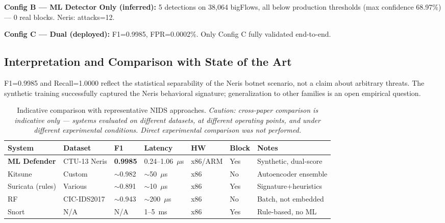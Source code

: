 \documentclass[11pt,a4paper]{article}
\begin{document}
    \textbf{Config B --- ML Detector Only (inferred):} 5 detections on 38,064 bigFlows, all
    below production thresholds (max confidence 68.97\%) --- 0 real blocks. Neris: attacks=12.

    \textbf{Config C --- Dual (deployed):} F1=0.9985, FPR=0.0002\%. Only Config C fully
    validated end-to-end.

    \subsection{Interpretation and Comparison with State of the Art}

    F1=0.9985 and Recall=1.0000 reflect the statistical separability of the Neris botnet
    scenario, not a claim about arbitrary threats. The synthetic training successfully captured
    the Neris behavioral signature; generalization to other families is an open empirical
    question.

    \begin{table}[h]
        \centering
        \footnotesize
        \caption{Indicative comparison with representative NIDS approaches. \emph{Caution:
        cross-paper comparison is indicative only --- systems evaluated on different datasets, at
        different operating points, and under different experimental conditions. Direct experimental
        comparison was not performed.}}
        \label{tab:comparison}
        \begin{tabular}{lllllll}
            \toprule
            \textbf{System} & \textbf{Dataset} & \textbf{F1} & \textbf{Latency} & \textbf{HW} & \textbf{Block} & \textbf{Notes} \\
            \midrule
            \textbf{ML Defender} & CTU-13 Neris & \textbf{0.9985} & 0.24--1.06~$\mu$s & x86/ARM & Yes & Synthetic, dual-score \\
            Kitsune~\cite{mirsky2018} & Custom & ${\sim}$0.982 & ${\sim}$50~$\mu$s & x86 & No & Autoencoder ensemble \\
            Suricata (rules) & Various & ${\sim}$0.891 & ${\sim}$10~$\mu$s & x86 & Yes & Signature+heuristics \\
            RF~\cite{sharafaldin2018} & CIC-IDS2017 & ${\sim}$0.943 & ${\sim}$200~$\mu$s & x86 & No & Batch, not embedded \\
            Snort & N/A & N/A & 1--5~ms & x86 & Yes & Rule-based, no ML \\
            \bottomrule
        \end{tabular}
    \end{table}
\end{document}
